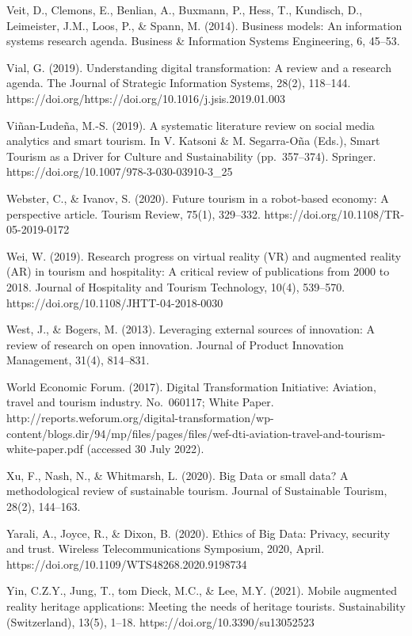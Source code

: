 \documentclass[
  letterpaper,
  DIV=11,
  numbers=noendperiod]{scrreprt}
\begin{document}
Veit, D., Clemons, E., Benlian, A., Buxmann, P., Hess, T., Kundisch, D.,
Leimeister, J.M., Loos, P., \& Spann, M. (2014). Business models: An
information systems research agenda. Business \& Information Systems
Engineering, 6, 45--53.

Vial, G. (2019). Understanding digital transformation: A review and a
research agenda. The Journal of Strategic Information Systems, 28(2),
118--144. https://doi.org/https://doi.org/10.1016/j.jsis.2019.01.003

Viñan-Ludeña, M.-S. (2019). A systematic literature review on social
media analytics and smart tourism. In V. Katsoni \& M. Segarra-Oña
(Eds.), Smart Tourism as a Driver for Culture and Sustainability
(pp.~357--374). Springer. https://doi.org/10.1007/978-3-030-03910-3\_25

Webster, C., \& Ivanov, S. (2020). Future tourism in a robot-based
economy: A perspective article. Tourism Review, 75(1), 329--332.
https://doi.org/10.1108/TR-05-2019-0172

Wei, W. (2019). Research progress on virtual reality (VR) and augmented
reality (AR) in tourism and hospitality: A critical review of
publications from 2000 to 2018. Journal of Hospitality and Tourism
Technology, 10(4), 539--570. https://doi.org/10.1108/JHTT-04-2018-0030

West, J., \& Bogers, M. (2013). Leveraging external sources of
innovation: A review of research on open innovation. Journal of Product
Innovation Management, 31(4), 814--831.

World Economic Forum. (2017). Digital Transformation Initiative:
Aviation, travel and tourism industry. No.~060117; White Paper.
http://reports.weforum.org/digital-transformation/wp-content/blogs.dir/94/mp/files/pages/files/wef-dti-aviation-travel-and-tourism-white-paper.pdf
(accessed 30 July 2022).

Xu, F., Nash, N., \& Whitmarsh, L. (2020). Big Data or small data? A
methodological review of sustainable tourism. Journal of Sustainable
Tourism, 28(2), 144--163.

Yarali, A., Joyce, R., \& Dixon, B. (2020). Ethics of Big Data: Privacy,
security and trust. Wireless Telecommunications Symposium, 2020, April.
https://doi.org/10.1109/WTS48268.2020.9198734

Yin, C.Z.Y., Jung, T., tom Dieck, M.C., \& Lee, M.Y. (2021). Mobile
augmented reality heritage applications: Meeting the needs of heritage
tourists. Sustainability (Switzerland), 13(5), 1--18.
https://doi.org/10.3390/su13052523
\end{document}
